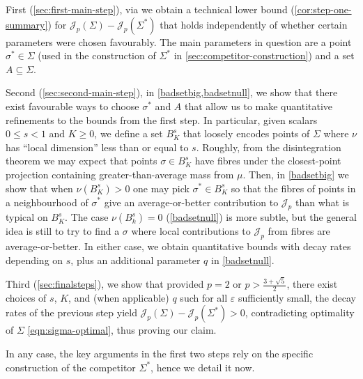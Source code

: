 \documentclass[preprint, reqno]{amsart}
\renewcommand{\epsilon}{\varepsilon}
\theoremstyle{definition}
\numberwithin{equation}{section}
\begin{document}
First (\cref{sec:first-main-step}), via
 we obtain a technical
lower bound (\cref{cor:step-one-summary}) for $\mathscr J_p(\Sigma) -
\mathscr J_p(\Sigma^*)$ that holds independently of whether certain
parameters were chosen favourably. The main parameters in question are
a point $\sigma^* \in \Sigma$ (used in the construction of $\Sigma^*$
in \cref{sec:competitor-construction}) and a set $A \subseteq \Sigma$.

Second (\cref{sec:second-main-step}), in \cref{badsetbig,badsetnull},
we show that there exist favourable ways to choose $\sigma^*$ and $A$
that allow us to make quantitative refinements to the bounds from the
first step. In particular, given scalars $0 \leq s < 1$ and $K \geq
0$, we define a set $B_{K}^s$ that loosely encodes points of $\Sigma$
where $\nu$ has ``local dimension'' less than or equal to $s$.
Roughly, from the disintegration theorem we may expect that points
$\sigma \in B_{K}^s$ have fibres under the closest-point projection
containing greater-than-average mass from $\mu$. Then, in
\cref{badsetbig} we show that when $\nu(B_K^s) > 0$ one may pick
$\sigma^* \in B_K^s$ so that the fibres of points in a neighbourhood
of $\sigma^*$ give an average-or-better contribution to $\mathscr J_p$
than what is typical on $B_K^s$. The case $\nu(B_k^s) = 0$
(\cref{badsetnull}) is more subtle, but the general idea is still to
try to find a $\sigma$ where local contributions to $\mathscr J_p$
from fibres are average-or-better. In either case, we obtain
quantitative bounds with decay rates depending on $s$, plus an
additional parameter $q$ in \cref{badsetnull}.

Third (\cref{sec:finalsteps}), we show that provided $p=2$ or $p >
\frac{3 + \sqrt 5}{2}$, there exist choices of $s$, $K$, and (when
applicable) $q$ such for all $\epsilon$ sufficiently small, the decay
rates of the previous step yield $\mathscr J_p(\Sigma) - \mathscr
J_p(\Sigma^*) > 0$, contradicting optimality of $\Sigma$
\eqref{eqn:sigma-optimal}, thus proving our claim.

In any case, the key arguments in the first two steps rely on the
specific construction of the competitor $\Sigma^*$, hence we detail it
now.
\end{document}
